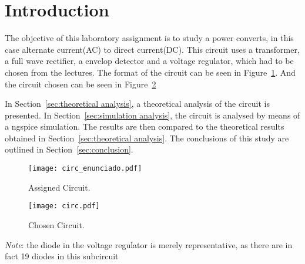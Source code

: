 \section{Introduction}
\label{sec:introduction}

The objective of this laboratory assignment is to study a power converts, in this case alternate current(AC) to direct current(DC).
This circuit uses a transformer, a full wave rectifier, a envelop detector and a voltage regulator, which had to be chosen from the lectures.
The format of the circuit can be seen in Figure~\ref{fig:format}. And the circuit chosen can be seen in Figure~\ref{fig:circuit}

In Section~\ref{sec:theoretical analysis}, a theoretical analysis of the circuit is
presented. In Section~\ref{sec:simulation analysis}, the circuit is analysed by
means of a ngspice simulation. The results are then compared to the theoretical results obtained in
Section~\ref{sec:theoretical analysis}. The conclusions of this study are outlined in
Section~\ref{sec:conclusion}.



\begin{figure}[h!] \centering
	\texttt{[image: circ\_enunciado.pdf]}
	\caption{Assigned Circuit.}
	\label{fig:format}
\end{figure}

\begin{figure}[h!] \centering
	\texttt{[image: circ.pdf]}
	\caption{Chosen Circuit.}
	\label{fig:circuit}
\end{figure}

\emph{Note}: the diode in the voltage regulator is merely representative, as there are in fact 19 diodes in this subcircuit

